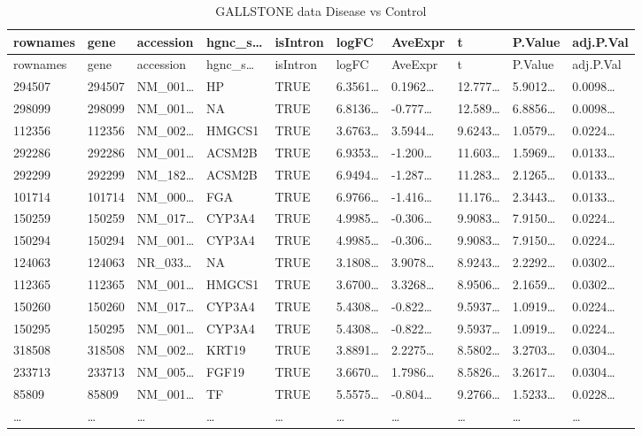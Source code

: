 \documentclass[
]{article}
\begin{document}
\begin{longtable}[]{@{}llllllllll@{}}
\caption{\label{tab:GALLSTONE-data-Disease-vs-Control}GALLSTONE data Disease vs Control}\tabularnewline
\toprule
rownames & gene & accession & hgnc\_s\ldots{} & isIntron & logFC & AveExpr & t & P.Value & adj.P.Val\tabularnewline
\midrule
\endfirsthead
\toprule
rownames & gene & accession & hgnc\_s\ldots{} & isIntron & logFC & AveExpr & t & P.Value & adj.P.Val\tabularnewline
\midrule
\endhead
294507 & 294507 & NM\_001\ldots{} & HP & TRUE & 6.3561\ldots{} & 0.1962\ldots{} & 12.777\ldots{} & 5.9012\ldots{} & 0.0098\ldots{}\tabularnewline
298099 & 298099 & NM\_001\ldots{} & NA & TRUE & 6.8136\ldots{} & -0.777\ldots{} & 12.589\ldots{} & 6.8856\ldots{} & 0.0098\ldots{}\tabularnewline
112356 & 112356 & NM\_002\ldots{} & HMGCS1 & TRUE & 3.6763\ldots{} & 3.5944\ldots{} & 9.6243\ldots{} & 1.0579\ldots{} & 0.0224\ldots{}\tabularnewline
292286 & 292286 & NM\_001\ldots{} & ACSM2B & TRUE & 6.9353\ldots{} & -1.200\ldots{} & 11.603\ldots{} & 1.5969\ldots{} & 0.0133\ldots{}\tabularnewline
292299 & 292299 & NM\_182\ldots{} & ACSM2B & TRUE & 6.9494\ldots{} & -1.287\ldots{} & 11.283\ldots{} & 2.1265\ldots{} & 0.0133\ldots{}\tabularnewline
101714 & 101714 & NM\_000\ldots{} & FGA & TRUE & 6.9766\ldots{} & -1.416\ldots{} & 11.176\ldots{} & 2.3443\ldots{} & 0.0133\ldots{}\tabularnewline
150259 & 150259 & NM\_017\ldots{} & CYP3A4 & TRUE & 4.9985\ldots{} & -0.306\ldots{} & 9.9083\ldots{} & 7.9150\ldots{} & 0.0224\ldots{}\tabularnewline
150294 & 150294 & NM\_001\ldots{} & CYP3A4 & TRUE & 4.9985\ldots{} & -0.306\ldots{} & 9.9083\ldots{} & 7.9150\ldots{} & 0.0224\ldots{}\tabularnewline
124063 & 124063 & NR\_033\ldots{} & NA & TRUE & 3.1808\ldots{} & 3.9078\ldots{} & 8.9243\ldots{} & 2.2292\ldots{} & 0.0302\ldots{}\tabularnewline
112365 & 112365 & NM\_001\ldots{} & HMGCS1 & TRUE & 3.6700\ldots{} & 3.3268\ldots{} & 8.9506\ldots{} & 2.1659\ldots{} & 0.0302\ldots{}\tabularnewline
150260 & 150260 & NM\_017\ldots{} & CYP3A4 & TRUE & 5.4308\ldots{} & -0.822\ldots{} & 9.5937\ldots{} & 1.0919\ldots{} & 0.0224\ldots{}\tabularnewline
150295 & 150295 & NM\_001\ldots{} & CYP3A4 & TRUE & 5.4308\ldots{} & -0.822\ldots{} & 9.5937\ldots{} & 1.0919\ldots{} & 0.0224\ldots{}\tabularnewline
318508 & 318508 & NM\_002\ldots{} & KRT19 & TRUE & 3.8891\ldots{} & 2.2275\ldots{} & 8.5802\ldots{} & 3.2703\ldots{} & 0.0304\ldots{}\tabularnewline
233713 & 233713 & NM\_005\ldots{} & FGF19 & TRUE & 3.6670\ldots{} & 1.7986\ldots{} & 8.5826\ldots{} & 3.2617\ldots{} & 0.0304\ldots{}\tabularnewline
85809 & 85809 & NM\_001\ldots{} & TF & TRUE & 5.5575\ldots{} & -0.804\ldots{} & 9.2766\ldots{} & 1.5233\ldots{} & 0.0228\ldots{}\tabularnewline
\ldots{} & \ldots{} & \ldots{} & \ldots{} & \ldots{} & \ldots{} & \ldots{} & \ldots{} & \ldots{} & \ldots{}\tabularnewline
\bottomrule
\end{longtable}
\end{document}

